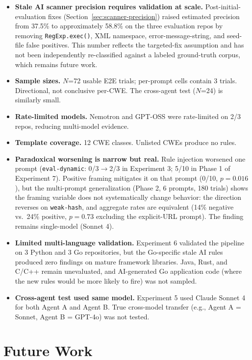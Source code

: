\documentclass[conference,10pt]{IEEEtran}
\begin{document}
\begin{itemize}
    \item \textbf{Stale AI scanner precision requires validation at scale.} Post-initial-evaluation fixes (Section~\ref{sec:scanner-precision}) raised estimated precision from 37.5\% to approximately 58.8\% on the three evaluation repos by removing \texttt{RegExp.exec()}, XML namespace, error-message-string, and seed-file false positives. This number reflects the targeted-fix assumption and has not been independently re-classified against a labeled ground-truth corpus, which remains future work.
    \item \textbf{Sample sizes.} $N$=72 usable E2E trials; per-prompt cells contain 3 trials. Directional, not conclusive per-CWE. The cross-agent test ($N$=24) is similarly small.
    \item \textbf{Rate-limited models.} Nemotron and GPT-OSS were rate-limited on 2/3 repos, reducing multi-model evidence.
    \item \textbf{Template coverage.} 12 CWE classes. Unlisted CWEs produce no rules.
    \item \textbf{Paradoxical worsening is narrow but real.} Rule injection worsened one prompt (\texttt{eval-dynamic}: 0/3$\rightarrow$2/3 in Experiment 3; 5/10 in Phase 1 of Experiment 7). Positive framing mitigates it on that prompt (0/10, $p{=}0.016$), but the multi-prompt generalization (Phase 2, 6 prompts, 180 trials) shows the framing variable does not systematically change behavior: the direction reverses on \texttt{weak-hash}, and aggregate rates are equivalent (14\% negative vs.\ 24\% positive, $p{=}0.73$ excluding the explicit-URL prompt). The finding remains single-model (Sonnet 4).
    \item \textbf{Limited multi-language validation.} Experiment 6 validated the pipeline on 3 Python and 3 Go repositories, but the Go-specific stale AI rules produced zero findings on mature framework libraries. Java, Rust, and C/C++ remain unevaluated, and AI-generated Go application code (where the new rules would be more likely to fire) was not sampled.
    \item \textbf{Cross-agent test used same model.} Experiment 5 used Claude Sonnet 4 for both Agent A and Agent B. True cross-model transfer (e.g., Agent A = Sonnet, Agent B = GPT-4o) was not tested.
\end{itemize}

\section{Future Work}
\end{document}
